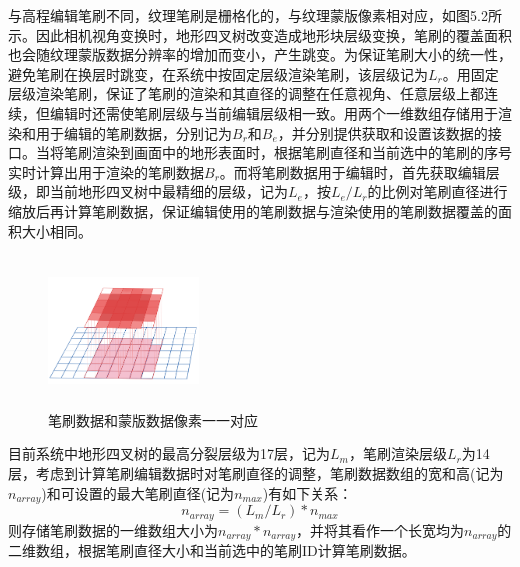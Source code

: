 与高程编辑笔刷不同，纹理笔刷是栅格化的，与纹理蒙版像素相对应，如图5.2所示。因此相机视角变换时，地形四叉树改变造成地形块层级变换，笔刷的覆盖面积也会随纹理蒙版数据分辨率的增加而变小，产生跳变。为保证笔刷大小的统一性，避免笔刷在换层时跳变，在系统中按固定层级渲染笔刷，该层级记为$L_r$。用固定层级渲染笔刷，保证了笔刷的渲染和其直径的调整在任意视角、任意层级上都连续，但编辑时还需使笔刷层级与当前编辑层级相一致。用两个一维数组存储用于渲染和用于编辑的笔刷数据，分别记为$B_r$和$B_e$，并分别提供获取和设置该数据的接口。当将笔刷渲染到画面中的地形表面时，根据笔刷直径和当前选中的笔刷的序号实时计算出用于渲染的笔刷数据$B_r$。而将笔刷数据用于编辑时，首先获取编辑层级，即当前地形四叉树中最精细的层级，记为$L_e$，按$L_e/L_r$的比例对笔刷直径进行缩放后再计算笔刷数据，保证编辑使用的笔刷数据与渲染使用的笔刷数据覆盖的面积大小相同。\par
\begin{figure}[htb]
    \centering
    \includegraphics[height=4cm ,width=4cm]{figures/brush2.png}
  \caption{笔刷数据和蒙版数据像素一一对应}
  \end{figure}
目前系统中地形四叉树的最高分裂层级为17层，记为$L_m$，笔刷渲染层级$L_r$为14层，考虑到计算笔刷编辑数据时对笔刷直径的调整，笔刷数据数组的宽和高(记为$n_{array}$)和可设置的最大笔刷直径(记为$n_{max}$)有如下关系：
\begin{equation}
n_{array}=(L_m/L_r)*n_{max}
\end{equation}
则存储笔刷数据的一维数组大小为$n_{array}*n_{array}$，并将其看作一个长宽均为$n_{array}$的二维数组，根据笔刷直径大小和当前选中的笔刷ID计算笔刷数据。\par
